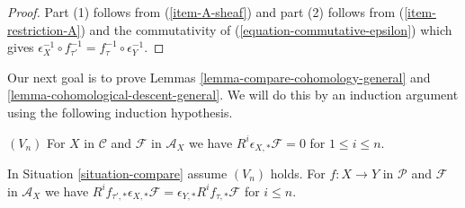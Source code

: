 \begin{proof}
Part (1) follows from (\ref{item-A-sheaf}) and part (2)
follows from (\ref{item-restriction-A}) and
the commutativity of (\ref{equation-commutative-epsilon}) which gives
$\epsilon_X^{-1} \circ f_{\tau'}^{-1} = f_\tau^{-1} \circ \epsilon_Y^{-1}$.
\end{proof}

\noindent
Our next goal is to prove Lemmas \ref{lemma-compare-cohomology-general} and
\ref{lemma-cohomological-descent-general}. We will do this by an induction
argument using the following induction hypothesis.

\medskip\noindent
$(V_n)$ For $X$ in $\mathcal{C}$ and $\mathcal{F}$ in $\mathcal{A}_X$
we have $R^i\epsilon_{X, *}\mathcal{F} = 0$ for $1 \leq i \leq n$.

\begin{lemma}
\label{lemma-V-implies-C-general}
In Situation \ref{situation-compare} assume $(V_n)$ holds.
For $f : X \to Y$ in $\mathcal{P}$ and $\mathcal{F}$ in $\mathcal{A}_X$
we have $R^if_{\tau', *}\epsilon_{X, *}\mathcal{F} =
\epsilon_{Y, *}R^if_{\tau, *}\mathcal{F}$ for $i \leq n$.
\end{lemma}

